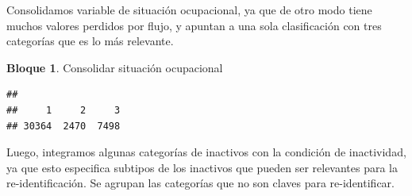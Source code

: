 \documentclass[]{book}
\newenvironment{Shaded}{\begin{snugshade}}{\end{snugshade}}
\newcommand{\CommentTok}[1]{\textcolor[rgb]{0.56,0.35,0.01}{\textit{#1}}}
\newcommand{\DecValTok}[1]{\textcolor[rgb]{0.00,0.00,0.81}{#1}}
\newcommand{\KeywordTok}[1]{\textcolor[rgb]{0.13,0.29,0.53}{\textbf{#1}}}
\newcommand{\NormalTok}[1]{#1}
\newcommand{\OperatorTok}[1]{\textcolor[rgb]{0.81,0.36,0.00}{\textbf{#1}}}
\newcommand{\OtherTok}[1]{\textcolor[rgb]{0.56,0.35,0.01}{#1}}
\newcommand{\StringTok}[1]{\textcolor[rgb]{0.31,0.60,0.02}{#1}}
\theoremstyle{definition}
\theoremstyle{definition}
\newtheorem{example}{Bloque}[chapter]
\theoremstyle{definition}
\theoremstyle{definition}
\theoremstyle{remark}
\begin{document}
Consolidamos variable de situación ocupacional, ya que de otro modo tiene muchos valores perdidos por flujo, y apuntan a una sola clasificación con tres categorías que es lo más relevante.

\begin{example}
\protect\hypertarget{exm:bloque31nbm}{}{\label{exm:bloque31nbm} }Consolidar situación ocupacional
\end{example}

\begin{Shaded}
\end{Shaded}

\begin{verbatim}
## 
##     1     2     3 
## 30364  2470  7498
\end{verbatim}

Luego, integramos algunas categorías de inactivos con la condición de inactividad, ya que esto especifica subtipos de los inactivos que pueden ser relevantes para la re-identificación. Se agrupan las categorías que no son claves para re-identificar.
\end{document}
